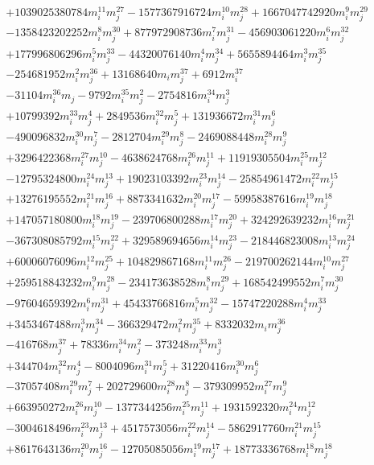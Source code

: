 {\begin{align*}
&+1039025380784m_i^{11}m_j^{27}-1577367916724m_i^{10}m_j^{28}+1667047742920m_i^{9}m_j^{29}\\
&-1358423202252m_i^{8}m_j^{30}+877972908736m_i^{7}m_j^{31}-456903061220m_i^{6}m_j^{32}\\
&+177996806296m_i^{5}m_j^{33}-44320076140m_i^{4}m_j^{34}+5655894464m_i^{3}m_j^{35}\\
&-254681952m_i^{2}m_j^{36}+13168640m_im_j^{37}+6912m_i^{37}\\
&-31104m_i^{36}m_j-9792m_i^{35}m_j^{2}-2754816m_i^{34}m_j^{3}\\
&+10799392m_i^{33}m_j^{4}+2849536m_i^{32}m_j^{5}+131936672m_i^{31}m_j^{6}\\
&-490096832m_i^{30}m_j^{7}-2812704m_i^{29}m_j^{8}-2469088448m_i^{28}m_j^{9}\\
&+3296422368m_i^{27}m_j^{10}-4638624768m_i^{26}m_j^{11}+11919305504m_i^{25}m_j^{12}\\
&-12795324800m_i^{24}m_j^{13}+19023103392m_i^{23}m_j^{14}-25854961472m_i^{22}m_j^{15}\\
&+13276195552m_i^{21}m_j^{16}+8873341632m_i^{20}m_j^{17}-59958387616m_i^{19}m_j^{18}\\
&+147057180800m_i^{18}m_j^{19}-239706800288m_i^{17}m_j^{20}+324292639232m_i^{16}m_j^{21}\\
&-367308085792m_i^{15}m_j^{22}+329589694656m_i^{14}m_j^{23}-218446823008m_i^{13}m_j^{24}\\
&+60006076096m_i^{12}m_j^{25}+104829867168m_i^{11}m_j^{26}-219700262144m_i^{10}m_j^{27}\\
&+259518843232m_i^{9}m_j^{28}-234173638528m_i^{8}m_j^{29}+168542499552m_i^{7}m_j^{30}\\
&-97604659392m_i^{6}m_j^{31}+45433766816m_i^{5}m_j^{32}-15747220288m_i^{4}m_j^{33}\\
&+3453467488m_i^{3}m_j^{34}-366329472m_i^{2}m_j^{35}+8332032m_im_j^{36}\\
&-416768m_j^{37}+78336m_i^{34}m_j^{2}-373248m_i^{33}m_j^{3}\\
&+344704m_i^{32}m_j^{4}-8004096m_i^{31}m_j^{5}+31220416m_i^{30}m_j^{6}\\
&-37057408m_i^{29}m_j^{7}+202729600m_i^{28}m_j^{8}-379309952m_i^{27}m_j^{9}\\
&+663950272m_i^{26}m_j^{10}-1377344256m_i^{25}m_j^{11}+1931592320m_i^{24}m_j^{12}\\
&-3004618496m_i^{23}m_j^{13}+4517573056m_i^{22}m_j^{14}-5862917760m_i^{21}m_j^{15}\\
&+8617643136m_i^{20}m_j^{16}-12705085056m_i^{19}m_j^{17}+18773336768m_i^{18}m_j^{18}\\

\end{align*}}
